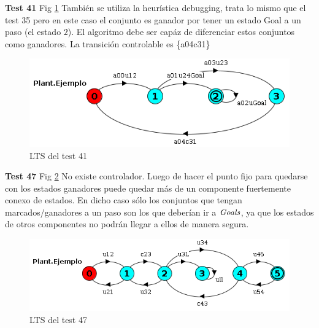 \smallskip
\textbf{Test 41} Fig \ref{fig:test41}
También se utiliza la heurística debugging, trata lo mismo que el test 35 pero en este caso el conjunto es ganador por tener un estado Goal a un paso (el estado $2$). El algoritmo debe ser capáz de diferenciar estos conjuntos como ganadores. La transición controlable es \{a04c31\}
\begin{figure}[h]
 \centering
 \includegraphics[scale=0.7]{figures/tests/test41.png}
 \caption{LTS del test 41}
 \label{fig:test41}
\end{figure}


\smallskip
\textbf{Test 47} Fig \ref{fig:test47}
No existe controlador. Luego de hacer el punto fijo para quedarse con los estados ganadores puede quedar más de un componente fuertemente conexo de estados. En dicho caso sólo los conjuntos que tengan marcados/ganadores a un paso son los que deberían ir a $\mathit{Goals}$, ya que los estados de otros componentes no podrán llegar a ellos de manera segura.
\begin{figure}[h]
 \centering
 \includegraphics[scale=0.7]{figures/tests/test47.png}
 \caption{LTS del test 47}
 \label{fig:test47}
\end{figure}
